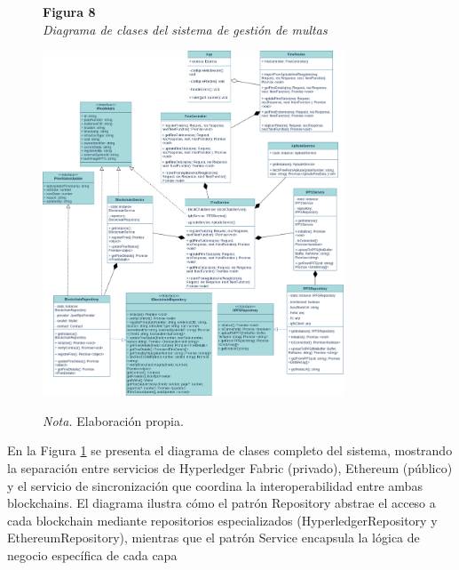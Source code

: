  \begin{figure}[htbp]
    \begin{flushleft}
        \textbf{Figura 8}\\[2em]
        \textit{Diagrama de clases del sistema de gestión de multas}
    \end{flushleft}
    \vspace{1em}
    \centering
    \includegraphics[width=0.8\textwidth]{Images/uml.png}
    \vspace{2em}
    \begin{flushleft}
        \textit{Nota.} Elaboración propia.
    \end{flushleft}
    \label{fig:diagrama_clases}
\end{figure}
En la Figura \ref{fig:diagrama_clases} se presenta el diagrama de clases completo del sistema, mostrando la separación entre servicios de Hyperledger Fabric (privado), Ethereum (público) y el servicio de sincronización que coordina la interoperabilidad entre ambas blockchains. El diagrama ilustra cómo el patrón Repository abstrae el acceso a cada blockchain mediante repositorios especializados (HyperledgerRepository y EthereumRepository), mientras que el patrón Service encapsula la lógica de negocio específica de cada capa
